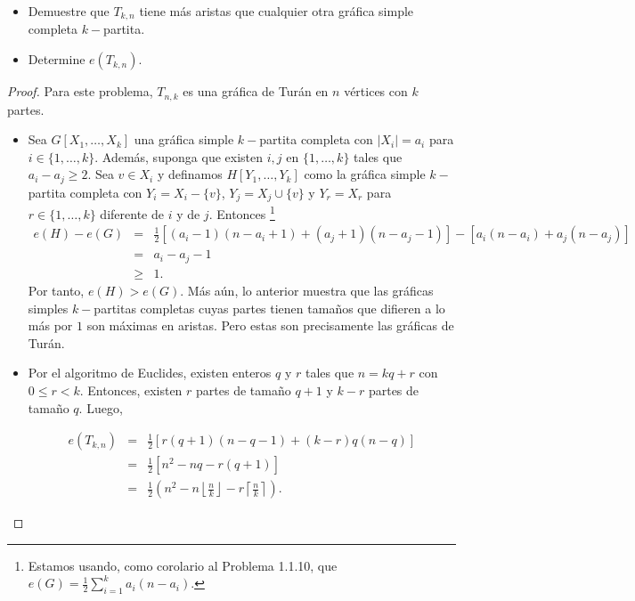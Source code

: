 \documentclass[12pt]{article}
\newenvironment{problem}[2][Problema]{\begin{trivlist}
\item[\hskip \labelsep {\bfseries #1}\hskip \labelsep {\bfseries #2.}]}{\end{trivlist}}
\begin{document}
\begin{problem}{1.1.11} \text{ }
\begin{itemize}
    \item[a)] Demuestre que $T_{k,n}$ tiene más aristas que cualquier otra gráfica simple completa $k-$partita.
    \item[b)] Determine $e(T_{k,n})$.
\end{itemize}
\end{problem}
\begin{proof} Para este problema, $T_{n,k}$ es una gráfica de Turán en $n$ vértices con $k$ partes.
\begin{itemize}
    \item[a)] Sea $G[X_1, \ldots, X_k]$ una gráfica simple $k-$partita completa con $\lvert X_i \rvert = a_i$ para $i\in \{1, \ldots, k\}$. Además, suponga que existen $i,j$ en $\{1,\ldots, k\}$ tales que $a_i - a_j  \geq 2$. Sea $v \in X_i$ y definamos $H[Y_1, \ldots, Y_k]$ como la gráfica simple $k-$partita completa con $Y_i = X_i - \{v\}$, $Y_j = X_j \cup \{v\}$ y $Y_r = X_r$ para $r\in\{1,\ldots, k\}$ diferente de $i$ y de $j.$ Entonces \footnote{Estamos usando, como corolario al Problema 1.1.10, que $e(G) = \frac{1}{2}\sum_{i=1}^k a_i (n-a_i).$}
    \begin{eqnarray*}
    e(H) - e(G) &=& \frac{1}{2}[(a_i-1)(n-a_i+1) + (a_j+1)(n - a_j - 1)] - [a_i(n-a_i) + a_j(n-a_j) ]\\
    &=& a_i-a_j-1 \\
    &\geq& 1.
    \end{eqnarray*}
    Por tanto, $e(H) > e(G).$ Más aún, lo anterior muestra que las gráficas simples $k-$partitas completas cuyas partes tienen tamaños que difieren a lo más por $1$ son máximas en aristas. Pero estas son precisamente las gráficas de Turán.
    
    \item[b)] Por el algoritmo de Euclides, existen enteros $q$ y $r$ tales que $n = kq + r$ con $0 \leq r < k$. Entonces, existen $r$ partes de tamaño $q+1$ y $k-r$ partes de tamaño $q.$ Luego,
    
    \begin{eqnarray*}
    e(T_{k,n}) &=& \frac{1}{2} \left[ r(q+1)(n-q-1) + (k-r) q(n-q) \right] \\
    &=& \frac{1}{2} \left[ n^2 - nq - r(q+1) \right] \\ 
    &=& \frac{1}{2} \left(n^2 - n \left\lfloor \frac{n}{k} \right\rfloor - r \left\lceil \frac{n}{k} \right\rceil \right).
    \end{eqnarray*}
\end{itemize}
\end{proof}
\end{document}
